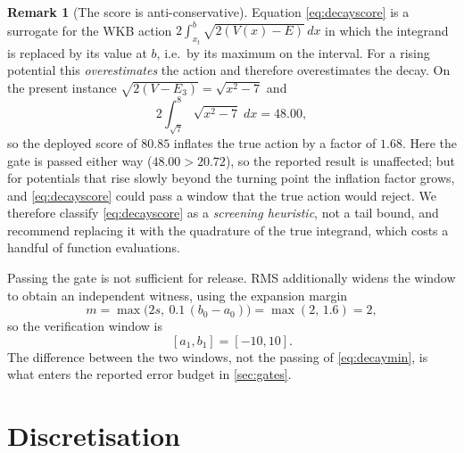 \documentclass[twocolumn,10pt,a4paper]{article}
\theoremstyle{plain}
\theoremstyle{definition}
\newtheorem{remark}{Remark}
\begin{document}
\begin{remark}[The score is anti-conservative]
\label{rem:anticonservative}
Equation \eqref{eq:decayscore} is a surrogate for the WKB action
$2\int_{x_{t}}^{b}\sqrt{2(V(x)-E)}\,dx$ in which the integrand is replaced by
its value at $b$, i.e.\ by its maximum on the interval. For a rising potential
this \emph{overestimates} the action and therefore overestimates the decay. On
the present instance $\sqrt{2(V-E_{3})} = \sqrt{x^{2}-7}$ and
\begin{equation}
2\int_{\sqrt{7}}^{8}\sqrt{x^{2}-7}\;dx = 48.00,
\end{equation}
so the deployed score of $80.85$ inflates the true action by a factor of
$1.68$. Here the gate is passed either way ($48.00 > 20.72$), so the reported
result is unaffected; but for potentials that rise slowly beyond the turning
point the inflation factor grows, and \eqref{eq:decayscore} could pass a window
that the true action would reject. We therefore classify \eqref{eq:decayscore}
as a \emph{screening heuristic}, not a tail bound, and recommend replacing it
with the quadrature of the true integrand, which costs a handful of function
evaluations.
\end{remark}

Passing the gate is not sufficient for release. RMS additionally widens the
window to obtain an independent witness, using the expansion margin
\begin{equation}
m = \max\!\big(2s,\ 0.1\,(b_{0}-a_{0})\big) = \max(2,\,1.6) = 2,
\end{equation}
so the verification window is
\begin{equation}
\boxed{[a_{1},b_{1}] = [-10,10]} .
\label{eq:window1}
\end{equation}
The difference between the two windows, not the passing of \eqref{eq:decaymin},
is what enters the reported error budget in \cref{sec:gates}.

\section{Discretisation}
\label{sec:discretisation}
\end{document}
